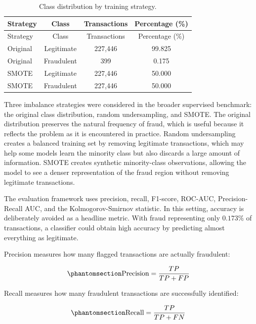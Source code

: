 \documentclass[
  12pt,
  letterpaper,
]{book}
\begin{document}
\begin{longtable}[]{@{}lccc@{}}
\caption{Class distribution by training
strategy.}\label{tbl-class-distribution-training-strategies}\tabularnewline
\toprule\noalign{}
Strategy & Class & Transactions & Percentage (\%) \\
\midrule\noalign{}
\endfirsthead
\toprule\noalign{}
Strategy & Class & Transactions & Percentage (\%) \\
\midrule\noalign{}
\endhead
\bottomrule\noalign{}
\endlastfoot
Original & Legitimate & 227,446 & 99.825 \\
Original & Fraudulent & 399 & 0.175 \\
SMOTE & Legitimate & 227,446 & 50.000 \\
SMOTE & Fraudulent & 227,446 & 50.000 \\
\end{longtable}

Three imbalance strategies were considered in the broader supervised
benchmark: the original class distribution, random undersampling, and
SMOTE. The original distribution preserves the natural frequency of
fraud, which is useful because it reflects the problem as it is
encountered in practice. Random undersampling creates a balanced
training set by removing legitimate transactions, which may help some
models learn the minority class but also discards a large amount of
information. SMOTE creates synthetic minority-class observations,
allowing the model to see a denser representation of the fraud region
without removing legitimate transactions.

The evaluation framework uses precision, recall, F1-score, ROC-AUC,
Precision-Recall AUC, and the Kolmogorov-Smirnov statistic. In this
setting, accuracy is deliberately avoided as a headline metric. With
fraud representing only \(0.173\%\) of transactions, a classifier could
obtain high accuracy by predicting almost everything as legitimate.

Precision measures how many flagged transactions are actually
fraudulent:

\begin{equation}\phantomsection\label{eq-precision}{
\text{Precision} = \frac{TP}{TP + FP}
}\end{equation}

Recall measures how many fraudulent transactions are successfully
identified:

\begin{equation}\phantomsection\label{eq-recall}{
\text{Recall} = \frac{TP}{TP + FN}
}\end{equation}
\end{document}
